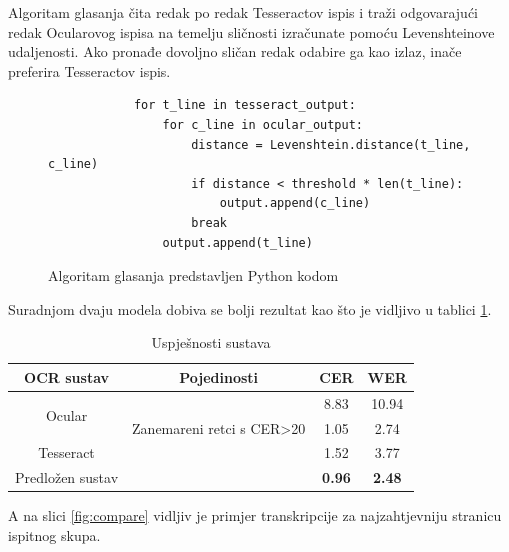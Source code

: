 \documentclass[zavrsnirad]{fer}
\begin{document}
Algoritam glasanja čita redak po redak Tesseractov ispis i traži odgovarajući redak Ocularovog ispisa na temelju sličnosti izračunate pomoću Levenshteinove udaljenosti. Ako pronađe dovoljno sličan redak odabire ga kao izlaz, inače preferira Tesseractov ispis.

\begin{figure}[h]
	\centering
	\begin{adjustwidth}{1cm}{1cm}
		\begin{lstlisting}
			for t_line in tesseract_output:
				for c_line in ocular_output:
					distance = Levenshtein.distance(t_line, c_line)
					if distance < threshold * len(t_line):
						output.append(c_line)
					break
				output.append(t_line)
		\end{lstlisting}
	\end{adjustwidth}
	\caption{Algoritam glasanja predstavljen Python kodom}
	\label{fig:python_code}
\end{figure}

Suradnjom dvaju modela dobiva se bolji rezultat kao što je vidljivo u tablici \ref{tab:system_performance}.

\bgroup
\def\arraystretch{1.25}
\begin{table}[h]
	\centering
	\begin{tabular}{|c|c|c|c|}
		\hline
		\textbf{OCR sustav} & \textbf{Pojedinosti} & \textbf{CER} & \textbf{WER} \\ \hline
		\multirow{2}{*}{Ocular} & & 8.83 & 10.94 \\ \cline{2-4}
								& Zanemareni retci s CER>20 & 1.05 & 2.74 \\ \hline
		Tesseract & & 1.52 & 3.77 \\ \hline
		Predložen sustav & & \textbf{0.96} & \textbf{2.48} \\ \hline
	\end{tabular}
	\caption{Uspješnosti sustava}
	\label{tab:system_performance}
\end{table}
\egroup

A na slici \ref{fig:compare} vidljiv je primjer transkripcije za najzahtjevniju stranicu ispitnog skupa.
\end{document}

